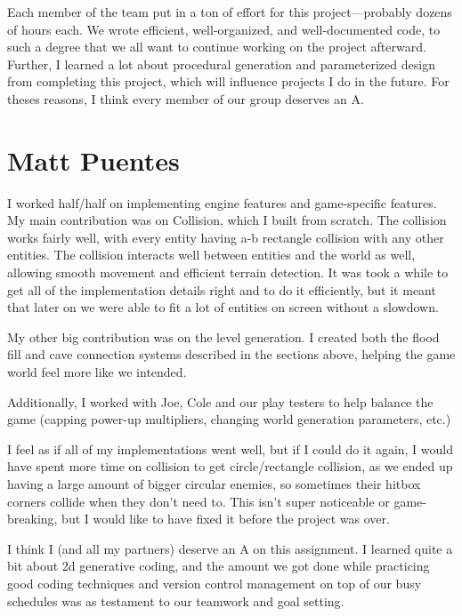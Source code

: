 \documentclass[a4paper, 12pt]{article}
\begin{document}
Each member of the team put in a ton of effort for this project---probably
dozens of hours each. We wrote efficient, well-organized, and well-documented
code, to such a degree that we all want to continue working on the project
afterward. Further, I learned a lot about procedural generation and
parameterized design from completing this project, which will influence projects
I do in the future. For theses reasons, I think every member of our group
deserves an A.

\section{Matt Puentes}

I worked half/half on implementing engine features and game-specific features.
My main contribution was on Collision, which I built from scratch. The collision
works fairly well, with every entity having a-b rectangle collision with any
other entities. The collision interacts well between entities and the world as
well, allowing smooth movement and efficient terrain detection. It was took a
while to get all of the implementation details right and to do it efficiently, 
but it meant that later on we were able to fit a lot of entities on screen
without a slowdown.

My other big contribution was on the level generation. I created both the
flood fill and cave connection systems described in the sections above, helping
the game world feel more like we intended.

Additionally, I worked with Joe, Cole and our play testers to help balance the
game (capping power-up multipliers, changing world generation parameters, etc.)

I feel as if all of my implementations went well, but if I could do it again, I
would have spent more time on collision to get circle/rectangle collision, as we
ended up having a large amount of bigger circular enemies, so sometimes their
hitbox corners collide when they don't need to. This isn't super noticeable or
game-breaking, but I would like to have fixed it before the project was over.

I think I (and all my partners) deserve an A on this assignment. I learned quite
a bit about 2d generative coding, and the amount we got done while practicing
good coding techniques and version control management on top of our busy
schedules was as testament to our teamwork and goal setting.
\end{document}
